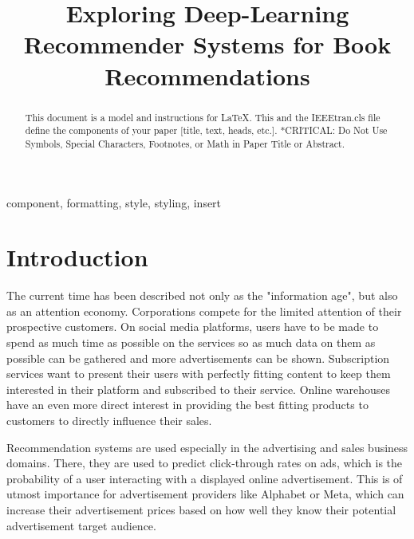 \documentclass[10pt,draft,journal,a4paper,oneside,twocolumn]{IEEEtran}
\begin{document}
\title{Exploring Deep-Learning Recommender Systems for Book Recommendations}

\author{
}

\maketitle

\begin{abstract}
This document is a model and instructions for \LaTeX.
This and the IEEEtran.cls file define the components of your paper [title, text, heads, etc.]. *CRITICAL: Do Not Use Symbols, Special Characters, Footnotes, 
or Math in Paper Title or Abstract.
\end{abstract}

\begin{IEEEkeywords}
component, formatting, style, styling, insert
\end{IEEEkeywords}

\section{Introduction}
The current time has been described not only as the "information age", but also as an attention economy. Corporations compete for the limited attention of their prospective customers. On social media platforms, users have to be made to spend as much time as possible on the services so as much data on them as possible can be gathered and more advertisements can be shown. Subscription services want to present their users with perfectly fitting content to keep them interested in their platform and subscribed to their service. Online warehouses have an even more direct interest in providing the best fitting products to customers to directly influence their sales.

Recommendation systems are used especially in the advertising and sales business domains. There, they are used to predict click-through rates on ads, which is the probability of a user interacting with a displayed online advertisement. This is of utmost importance for advertisement providers like Alphabet or Meta, which can increase their advertisement prices based on how well they know their potential advertisement target audience. 
\end{document}
